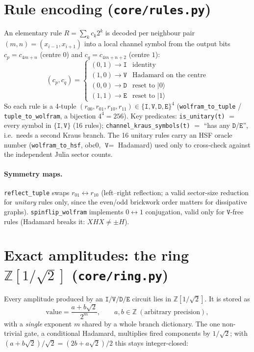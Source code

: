 \documentclass[11pt]{article}
\newcommand{\rt}[1]{\texttt{#1}}
\newcommand{\pf}[1]{\texttt{#1}}          %
\newcommand{\fn}[1]{\texttt{#1}}          %
\providecommand{\ket}[1]{|#1\rangle}
\newcommand{\Zh}{\mathbb{Z}[1/\sqrt2]}
\begin{document}
\section{Rule encoding (\pf{core/rules.py})}
\label{sec:rules}
An elementary rule $R=\sum_k c_k 2^k$ is decoded per neighbour pair
$(m,n)=(x_{i-1},x_{i+1})$ into a local channel symbol from the output bits
$c_p=c_{4m+n}$ (centre $0$) and $c_q=c_{4m+n+2}$ (centre $1$):
\[
(c_p,c_q)=\begin{cases}
(0,1)\to\rt I & \text{identity}\\
(1,0)\to\rt V & \text{Hadamard on the centre}\\
(0,0)\to\rt D & \text{reset to }\ket0\\
(1,1)\to\rt E & \text{reset to }\ket1
\end{cases}
\]
So each rule is a 4-tuple $(r_{00},r_{01},r_{10},r_{11})\in\{\rt I,\rt V,\rt D,\rt E\}^4$
(\fn{wolfram\_to\_tuple} / \fn{tuple\_to\_wolfram}, a bijection $4^4=256$). Key
predicates: \fn{is\_unitary(t)} $=$ every symbol in $\{\rt I,\rt V\}$ (16 rules);
\fn{channel\_kraus\_symbols(t)} $=$ ``has any $\rt D$/$\rt E$'', i.e.\ needs a
second Kraus branch. The 16 unitary rules carry an HSF oracle number
(\fn{wolfram\_to\_hsf}, obc0, $\rt V=$ Hadamard) used only to cross-check against
the independent Julia sector counts.

\paragraph{Symmetry maps.} \fn{reflect\_tuple} swaps $r_{01}\leftrightarrow r_{10}$
(left--right reflection; a valid sector-size reduction for \emph{unitary} rules
only, since the even/odd brickwork order matters for dissipative graphs).
\fn{spinflip\_wolfram} implements $0\!\leftrightarrow\!1$ conjugation, valid only
for $\rt V$-free rules (Hadamard breaks it: $XHX\neq\pm H$).

\section{Exact amplitudes: the ring \texorpdfstring{$\Zh$}{Z[1/sqrt2]}
(\pf{core/ring.py})}
\label{sec:ring}
Every amplitude produced by an $\rt I/\rt V/\rt D/\rt E$ circuit lies in $\Zh$.
It is stored as
\[
\text{value}=\frac{a+b\sqrt2}{2^{m}},\qquad a,b\in\mathbb Z\ (\text{arbitrary
precision}),
\]
with a \emph{single} exponent $m$ shared by a whole branch dictionary. The one
non-trivial gate, a conditional Hadamard, multiplies fired components by
$1/\sqrt2$; with $(a+b\sqrt2)/\sqrt2=(2b+a\sqrt2)/2$ this stays integer-closed:
\end{document}
